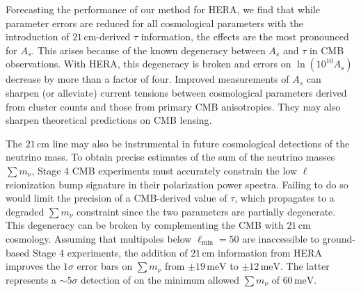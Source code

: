 \documentclass[twocolumn,aps,prd,nofootinbib,showpacs,superscriptaddress]{revtex4-1}
\begin{document}
Forecasting the performance of our method for HERA, we find that while parameter errors are reduced for all cosmological parameters with the introduction of $21\,\textrm{cm}$-derived $\tau$ information, the effects are the most pronounced for $A_s$. This arises because of the known degeneracy between $A_s$ and $\tau$ in CMB observations. With HERA, this degeneracy is broken and errors on $\ln (10^{10} A_s)$ decrease by more than a factor of four. Improved measurements of $A_s$ can sharpen (or alleviate) current tensions between cosmological parameters derived from cluster counts and those from primary CMB anisotropies. They may also sharpen theoretical predictions on CMB lensing.

The $21\,\textrm{cm}$ line may also be instrumental in future cosmological detections of the neutrino mass. To obtain precise estimates of the sum of the neutrino masses $\sum m_\nu$, Stage 4 CMB experiments must accurately constrain the low $\ell$ reionization bump signature in their polarization power spectra. Failing to do so would limit the precision of a CMB-derived value of $\tau$, which propagates to a degraded $\sum m_\nu$ constraint since the two parameters are partially degenerate. This degeneracy can be broken by complementing the CMB with $21\,\textrm{cm}$ cosmology. Assuming that multipoles below $\ell_\textrm{min} = 50$ are inaccessible to ground-based Stage 4 experiments, the addition of $21\,\textrm{cm}$ information from HERA improves the $1\sigma$ error bars on $\sum m_\nu$ from $\pm 19\,\textrm{meV}$ to $\pm 12\,\textrm{meV}$. The latter represents a $\sim\!5\sigma$ detection of on the minimum allowed $\sum m_\nu$ of $60\,\textrm{meV}$.
\end{document}
